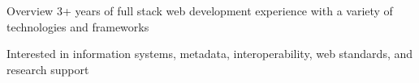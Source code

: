 \documentclass{resume} %
\begin{document}

  \begin{rSection}{Overview}
    3+ years of full stack web development experience with a variety of technologies and frameworks

    Interested in information systems, metadata, interoperability, web standards, and research support
  \end{rSection}
\end{document}

